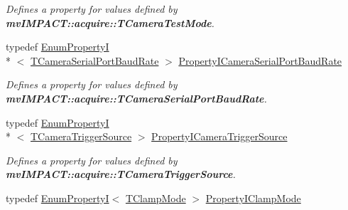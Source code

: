 \begin{DoxyCompactItemize}
\begin{DoxyCompactList}\small\item\em Defines a property for values defined by {\bfseries mv\+I\+M\+P\+A\+C\+T\+::acquire\+::\+T\+Camera\+Test\+Mode}. \end{DoxyCompactList}\item 
\hypertarget{group___device_specific_interface_ga74bf9929c27fa7d47798e130fa005e6a}{typedef \hyperlink{classmv_i_m_p_a_c_t_1_1acquire_1_1_enum_property_i}{Enum\+Property\+I}\\*
$<$ \hyperlink{group___device_specific_interface_ga6b592e04a4f1db924eba76ff6cad77dc}{T\+Camera\+Serial\+Port\+Baud\+Rate} $>$ \hyperlink{group___device_specific_interface_ga74bf9929c27fa7d47798e130fa005e6a}{Property\+I\+Camera\+Serial\+Port\+Baud\+Rate}}\label{group___device_specific_interface_ga74bf9929c27fa7d47798e130fa005e6a}

\begin{DoxyCompactList}\small\item\em Defines a property for values defined by {\bfseries mv\+I\+M\+P\+A\+C\+T\+::acquire\+::\+T\+Camera\+Serial\+Port\+Baud\+Rate}. \end{DoxyCompactList}\item 
\hypertarget{group___device_specific_interface_ga40354af1fd85b454ec1b4e5ca007755d}{typedef \hyperlink{classmv_i_m_p_a_c_t_1_1acquire_1_1_enum_property_i}{Enum\+Property\+I}\\*
$<$ \hyperlink{group___device_specific_interface_ga18243d80e95a98e9596ed83ed96cdb54}{T\+Camera\+Trigger\+Source} $>$ \hyperlink{group___device_specific_interface_ga40354af1fd85b454ec1b4e5ca007755d}{Property\+I\+Camera\+Trigger\+Source}}\label{group___device_specific_interface_ga40354af1fd85b454ec1b4e5ca007755d}

\begin{DoxyCompactList}\small\item\em Defines a property for values defined by {\bfseries mv\+I\+M\+P\+A\+C\+T\+::acquire\+::\+T\+Camera\+Trigger\+Source}. \end{DoxyCompactList}\item 
\hypertarget{group___device_specific_interface_ga44f306409b1d737b2eea3f66767e2c23}{typedef \hyperlink{classmv_i_m_p_a_c_t_1_1acquire_1_1_enum_property_i}{Enum\+Property\+I}$<$ \hyperlink{group___device_specific_interface_gad42717c53ece3c90f468265fd0267ad2}{T\+Clamp\+Mode} $>$ \hyperlink{group___device_specific_interface_ga44f306409b1d737b2eea3f66767e2c23}{Property\+I\+Clamp\+Mode}}\label{group___device_specific_interface_ga44f306409b1d737b2eea3f66767e2c23}


\end{DoxyCompactItemize}
